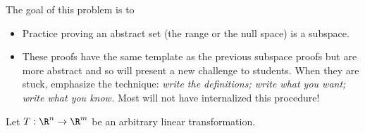 \documentclass{problemset}
\newcommand{\bookonlynewpage}{\begin{bookonly}\newpage\end{bookonly}}
\begin{document}
	\bookonlynewpage
	\question
	\begin{annotation}
		\begin{goals}

			The goal of this problem is to
			\begin{itemize}
				\item Practice proving an abstract set (the range or the null space) is a subspace.
			\end{itemize}
		\end{goals}

		\begin{notes}
			\begin{itemize}
				\item These proofs have the same template as the previous subspace proofs but
					are more abstract and so will present a new challenge to students. When
					they are stuck, emphasize the technique: \emph{write the definitions; write what you want; 
					write what you know.} Most will not have internalized this procedure!
			\end{itemize}
		\end{notes}
	\end{annotation}
	Let $T:\R^n\to\R^m$ be an arbitrary linear transformation.
\end{document}
